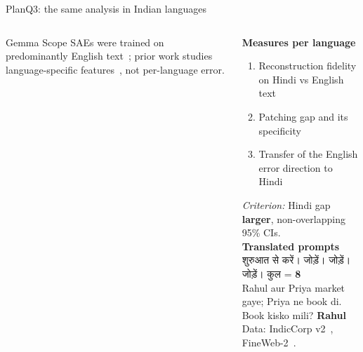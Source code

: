 \documentclass[aspectratio=169,10pt]{beamer}
\newcommand{\hindi}[2]{{\devanagarifont #1}}%
\newcommand{\hindi}[2]{\textit{#2}}%
\newcommand{\lat}[1]{{\normalfont #1}} %
\newcommand{\aside}[1]{{\color{ink2} #1}}
\newcommand{\stage}[1]{{\color{accent}#1}\;\textperiodcentered\;} %
\begin{document}
\begin{frame}{\stage{Plan}Q3: the same analysis in Indian languages}
  \begin{columns}[T]
    \begin{column}{0.42\textwidth}
      \centering

      \vspace{8pt}
      \raggedright\aside{Gemma Scope SAEs were trained on predominantly English text~\citep{lieberum2024gemmascope};
        prior work studies language-specific features~\citep{deng2025unveiling}, not per-language error.}
    \end{column}
    \begin{column}{0.56\textwidth}
      \small
      \textbf{Measures per language}
      \begin{enumerate}\setlength{\itemsep}{1pt}
        \item Reconstruction fidelity on Hindi vs English text
        \item Patching gap and its specificity
        \item Transfer of the English error direction to Hindi
      \end{enumerate}
      \aside{\textit{Criterion:} Hindi gap \textbf{larger}, non-overlapping 95\% CIs.}\\[6pt]
      \textbf{Translated prompts}\\[2pt]
      \hindi{शुरुआत \lat{2} से करें। \lat{3} जोड़ें। \lat{1} जोड़ें। \lat{2} जोड़ें। कुल \lat{=}}{shuruaat 2 se karen. 3 joden. 1 joden. 2 joden. kul =}
      \textbf{\color{accent}8}\\
      Rahul aur Priya market gaye; Priya ne book di. Book kisko mili? \textbf{\color{accent}Rahul}\\[4pt]
      \aside{Data: IndicCorp v2~\citep{doddapaneni2023towards}, FineWeb-2~\citep{penedo2025fineweb2}.}
    \end{column}
  \end{columns}
\end{frame}
\end{document}
